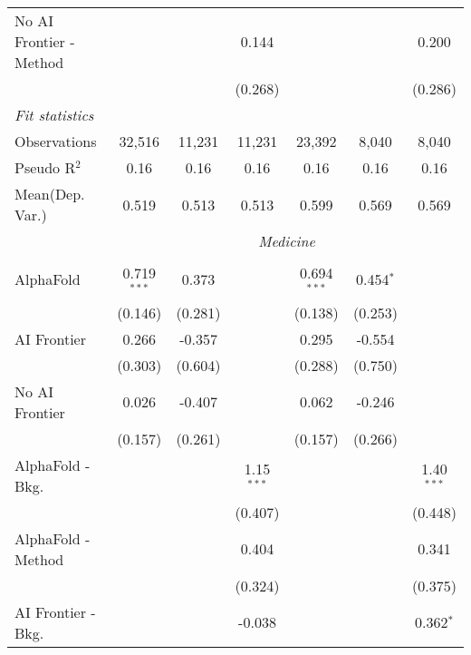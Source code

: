 \begin{tabular}{lcccccc}
   No AI Frontier - Method &               &               & 0.144         &               &               & 0.200\\   
                           &               &               & (0.268)       &               &               & (0.286)\\   
   \midrule
   \emph{Fit statistics}\\
   Observations            & 32,516        & 11,231        & 11,231        & 23,392        & 8,040         & 8,040\\  
   Pseudo R$^2$            & 0.16          & 0.16          & 0.16          & 0.16          & 0.16          & 0.16\\  
   
Mean(Dep. Var.) & 0.519 & 0.513 & 0.513 & 0.599 & 0.569 & 0.569 \\
 & \multicolumn{6}{c}{\textit{Medicine}} \\ \\
   AlphaFold               & 0.719$^{***}$ & 0.373   &              & 0.694$^{***}$ & 0.454$^{*}$ &   \\   
                           & (0.146)       & (0.281) &              & (0.138)       & (0.253)     &   \\   
   AI Frontier             & 0.266         & -0.357  &              & 0.295         & -0.554      &   \\   
                           & (0.303)       & (0.604) &              & (0.288)       & (0.750)     &   \\   
   No AI Frontier          & 0.026         & -0.407  &              & 0.062         & -0.246      &   \\   
                           & (0.157)       & (0.261) &              & (0.157)       & (0.266)     &   \\   
   AlphaFold - Bkg.        &               &         & 1.15$^{***}$ &               &             & 1.40$^{***}$\\   
                           &               &         & (0.407)      &               &             & (0.448)\\   
   AlphaFold - Method      &               &         & 0.404        &               &             & 0.341\\   
                           &               &         & (0.324)      &               &             & (0.375)\\   
   AI Frontier - Bkg.      &               &         & -0.038       &               &             & 0.362$^{*}$\\   

\end{tabular}

